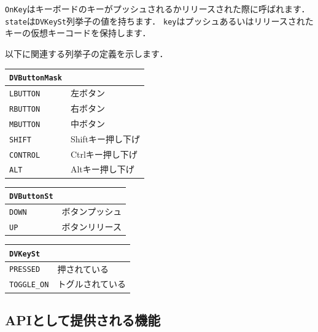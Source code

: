\texttt{OnKey}はキーボードのキーがプッシュされるかリリースされた際に呼ばれます．
\texttt{state}は\texttt{DVKeySt}列挙子の値を持ちます．
\texttt{key}はプッシュあるいはリリースされたキーの仮想キーコードを保持します．

\KLUDGE 以下に関連する列挙子の定義を示します．

\begin{center}
\begin{tabular}{p{.3\hsize}p{.6\hsize}}
\texttt{DVButtonMask}									\\ \midrule
\texttt{LBUTTON}				& 左ボタン				\\
\texttt{RBUTTON}				& 右ボタン				\\
\texttt{MBUTTON}				& 中ボタン				\\
\texttt{SHIFT}					& Shiftキー押し下げ		\\
\texttt{CONTROL}				& Ctrlキー押し下げ		\\
\texttt{ALT}					& Altキー押し下げ		\\
\end{tabular}
\end{center}

\begin{center}
\begin{tabular}{p{.3\hsize}p{.6\hsize}}
\texttt{DVButtonSt}								\\ \midrule
\texttt{DOWN}			& ボタンプッシュ		\\
\texttt{UP}				& ボタンリリース		\\
\end{tabular}
\end{center}

\begin{center}
\begin{tabular}{p{.3\hsize}p{.6\hsize}}
\texttt{DVKeySt}								\\ \midrule
\texttt{PRESSED}		& 押されている			\\
\texttt{TOGGLE\_ON}		& トグルされている		\\
\end{tabular}
\end{center}

\subsection*{APIとして提供される機能}

